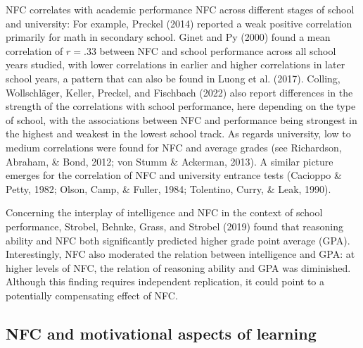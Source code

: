 \documentclass[
  man]{apa6}
\begin{document}
NFC correlates with academic performance NFC across different stages of school and university: For example, Preckel (2014) reported a weak positive correlation primarily for math in secondary school. Ginet and Py (2000) found a mean correlation of \(r=.33\) between NFC and school performance across all school years studied, with lower correlations in earlier and higher correlations in later school years, a pattern that can also be found in Luong et al. (2017). Colling, Wollschläger, Keller, Preckel, and Fischbach (2022) also report differences in the strength of the correlations with school performance, here depending on the type of school, with the associations between NFC and performance being strongest in the highest and weakest in the lowest school track. As regards university, low to medium correlations were found for NFC and average grades (see Richardson, Abraham, \& Bond, 2012; von Stumm \& Ackerman, 2013). A similar picture emerges for the correlation of NFC and university entrance tests (Cacioppo \& Petty, 1982; Olson, Camp, \& Fuller, 1984; Tolentino, Curry, \& Leak, 1990).

Concerning the interplay of intelligence and NFC in the context of school performance, Strobel, Behnke, Grass, and Strobel (2019) found that reasoning ability and NFC both significantly predicted higher grade point average (GPA). Interestingly, NFC also moderated the relation between intelligence and GPA: at higher levels of NFC, the relation of reasoning ability and GPA was diminished. Although this finding requires independent replication, it could point to a potentially compensating effect of NFC.

\hypertarget{nfc-and-motivational-aspects-of-learning}{%
\subsection{NFC and motivational aspects of learning}\label{nfc-and-motivational-aspects-of-learning}}
\end{document}

